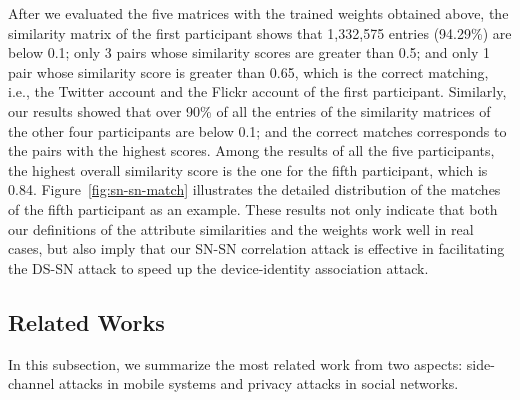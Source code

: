 \documentclass[letterpaper,12pt]{article}
\begin{document}
After we evaluated the five matrices with the trained weights obtained above, the similarity matrix of the first participant shows that 1,332,575 entries (94.29\%) are below 0.1; only 3 pairs whose similarity scores are greater than 0.5; and only 1 pair whose similarity score is greater than 0.65, which is the correct matching, i.e., the Twitter account and the Flickr account of the first participant. Similarly, our results showed that over 90\% of all the entries of the similarity matrices of the other four participants are below 0.1; and the correct matches corresponds to the  pairs with the highest scores. Among the results of all the five participants, the highest overall similarity score is the one for the fifth participant, which is 0.84. Figure~\ref{fig:sn-sn-match} illustrates the detailed distribution of the matches of the fifth participant as an example.
These results not only indicate that both our definitions of the attribute similarities and the weights work well in real cases, but also imply that our SN-SN correlation attack is effective in facilitating the DS-SN attack to speed up the device-identity association attack.

\subsection{Related Works}
\label{sec:related}

In this subsection, we summarize the most related work from two aspects: side-channel attacks in mobile systems and privacy attacks in social networks.
\end{document}
